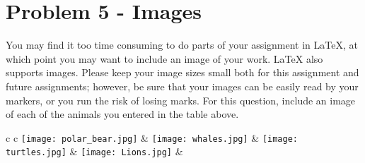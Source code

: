 \documentclass[12pt]{article}
\begin{document}
\section*{Problem 5 - Images}
You may find it too time consuming to do parts of your assignment in \LaTeX{}, at which 
point you may want to include an image of your work. \LaTeX{} also supports images. 
Please keep your image sizes small both for this assignment and future assignments; 
however, be sure that your images can be easily read by your markers, or you run the 
risk of losing marks. For this question, include an image of each of the animals you 
entered in the table above.\\


\begin{tabular}{ c c }
	\texttt{[image: polar\_bear.jpg]} &%
	\texttt{[image: whales.jpg]} &
	\texttt{[image: turtles.jpg]} &%
	\texttt{[image: Lions.jpg]} &%
\end{tabular}
\end{document}
